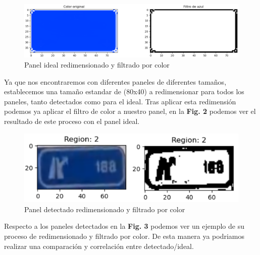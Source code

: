 \documentclass[a4paper, 12pt]{article}
\begin{document}
\begin{figure}[h]
	\centering
	\includegraphics[width=0.9\linewidth]{img/ideal_mask_resized_and_filtered}
	\caption{Panel ideal redimensionado y filtrado por color}
	\label{fig:idealmaskresizedandfiltered}
\end{figure}

Ya que nos encontraremos con diferentes paneles de diferentes tamaños, establecemos una tamaño estandar de (80x40) a redimensionar para todos los paneles, tanto detectados como para el ideal. Tras aplicar esta redimensión podemos ya aplicar el filtro de color a nuestro panel, en la \textbf{Fig. 2} podemos ver el resultado de este proceso con el panel ideal.
\begin{figure}[h]
	\centering
	\includegraphics[width=0.7\linewidth]{img/sections}
	\caption{Panel detectado redimensionado y filtrado por color}
	\label{fig:sections}
\end{figure}

Respecto a los paneles detectados en la \textbf{Fig. 3} podemos ver un ejemplo de su proceso de redimensionado y filtrado por color. De esta manera ya podriamos realizar una comparación y correlación entre detectado/ideal.
\end{document}
